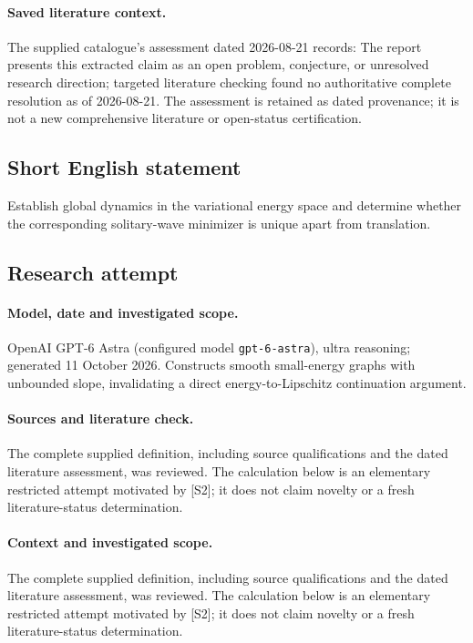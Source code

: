\documentclass[11pt]{article}
\begin{document}
\paragraph{Saved literature context.} The supplied catalogue's assessment dated 2026-08-21 records: The report presents this extracted claim as an open problem, conjecture, or unresolved research direction; targeted literature checking found no authoritative complete resolution as of 2026-08-21. The assessment is retained as dated provenance; it is not a new comprehensive literature or open-status certification.
\subsection{Short English statement}
Establish global dynamics in the variational energy space and determine whether the corresponding solitary-wave minimizer is unique apart from translation.
\subsection{Research attempt}
\paragraph{Model, date and investigated scope.}
OpenAI GPT-6 Astra (configured model \texttt{gpt-6-astra}), ultra reasoning; generated 11 October 2026. Constructs smooth small-energy graphs with unbounded slope, invalidating a direct energy-to-Lipschitz continuation argument.

\paragraph{Sources and literature check.}
The complete supplied definition, including source qualifications and the dated literature assessment, was reviewed. The calculation below is an elementary restricted attempt motivated by [S2]; it does not claim novelty or a fresh literature-status determination.

\paragraph{Context and investigated scope.} The complete supplied definition, including source qualifications and the dated literature assessment, was reviewed. The calculation below is an elementary restricted attempt motivated by [S2]; it does not claim novelty or a fresh literature-status determination.
\end{document}
